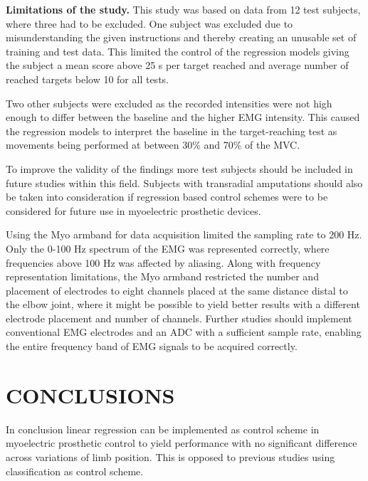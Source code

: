 \documentclass[a4paper, 10pt, conference]{ieeeconf}      %
\begin{document}
\textbf{Limitations of the study.}
This study was based on data from 12 test subjects, where three had to be excluded. One subject was excluded due to misunderstanding the given instructions and thereby creating an unusable set of training and test data. This limited the control of the regression models giving the subject a mean score above 25 s per target reached and average number of reached targets below 10 for all tests.

Two other subjects were excluded as the recorded intensities were not high enough to differ between the baseline and the higher EMG intensity. This caused the regression models to interpret the baseline in the target-reaching test as movements being performed at between 30\% and 70\% of the MVC. 

To improve the validity of the findings more test subjects should be included in future studies within this field. Subjects with transradial amputations should also be taken into consideration if regression based control schemes were to be considered for future use in myoelectric prosthetic devices. 

Using the Myo armband for data acquisition limited the sampling rate to 200 Hz. Only the 0-100 Hz spectrum of the EMG was represented correctly, where frequencies above 100 Hz was affected by aliasing. Along with frequency representation limitations, the Myo armband restricted the number and placement of electrodes to eight channels placed at the same distance distal to the elbow joint, where it might be possible to yield better results with a different electrode placement and number of channels. Further studies should implement conventional EMG electrodes and an ADC with a sufficient sample rate, enabling the entire frequency band of EMG signals to be acquired correctly.		
	
\section{CONCLUSIONS}%
	
% 		
In conclusion linear regression can be implemented as control scheme in myoelectric prosthetic control to yield performance with no significant difference across variations of limb position. This is opposed to previous studies using classification as control scheme.
 		
	
	
\end{document}
